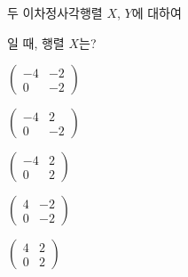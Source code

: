 두 이차정사각행렬 $X$, $Y$에 대하여\par\smallskip{}\par\smallskip\noindent 일 때, 행렬 $X$는?
\begin{choicesii}{\rule[-3.0ex]{0pt}{8.0ex}$\begin{pmatrix} -4 & -2 \\ 0 & -2 \end{pmatrix}$}{\rule[-3.0ex]{0pt}{8.0ex}$\begin{pmatrix} -4 & 2 \\ 0 & -2 \end{pmatrix}$}{\rule[-3.0ex]{0pt}{8.0ex}$\begin{pmatrix} -4 & 2 \\ 0 & 2 \end{pmatrix}$}{\rule[-3.0ex]{0pt}{8.0ex}$\begin{pmatrix} 4 & -2 \\ 0 & -2 \end{pmatrix}$}{\rule[-3.0ex]{0pt}{8.0ex}$\begin{pmatrix} 4 & 2 \\ 0 & 2 \end{pmatrix}$}\end{choicesii}
